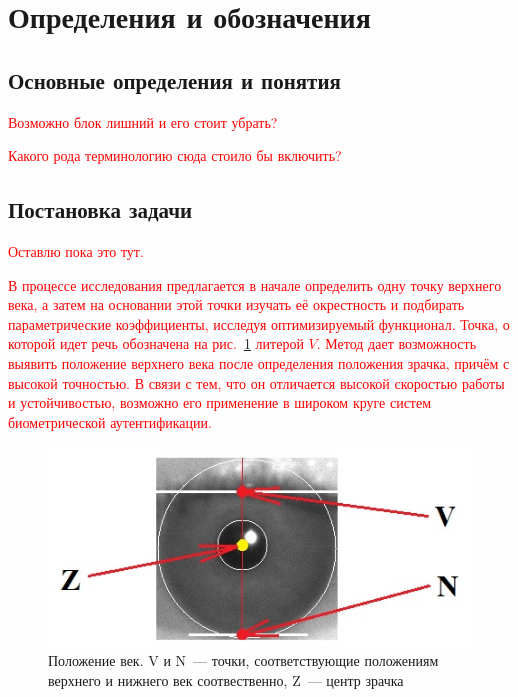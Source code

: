\documentclass[12pt]{article} %
\begin{document}
\newpage
\section{Определения и обозначения}

\subsection{Основные определения и понятия}

\textcolor{red}{Возможно блок лишний и его стоит убрать?}

\textcolor{red}{Какого рода терминологию сюда стоило бы включить?}

\subsection{Постановка задачи}
\textcolor{red}{Оставлю пока это тут.}

\textcolor{red}{
	В процессе исследования предлагается в начале определить одну точку верхнего века, а затем на основании этой точки изучать её окрестность и подбирать параметрические коэффициенты, исследуя оптимизируемый функционал. Точка, о которой идет речь обозначена на рис.~\ref{fig:glaz2} литерой $V$.
	Метод дает возможность выявить положение верхнего века после определения положения зрачка, причём с высокой точностью. В связи с тем, что он отличается высокой скоростью работы и устойчивостью, возможно его применение в широком круге систем биометрической аутентификации.}

\begin{figure}[h]
	
	\centering
	
	\includegraphics[width=0.6\linewidth]{glaz2.jpg}
	
	\caption{Положение век. V и N~--- точки, соответствующие положениям верхнего и нижнего век соотвественно, Z~--- центр зрачка}
	
	\label{fig:glaz2}
	
\end{figure}

\end{document}
